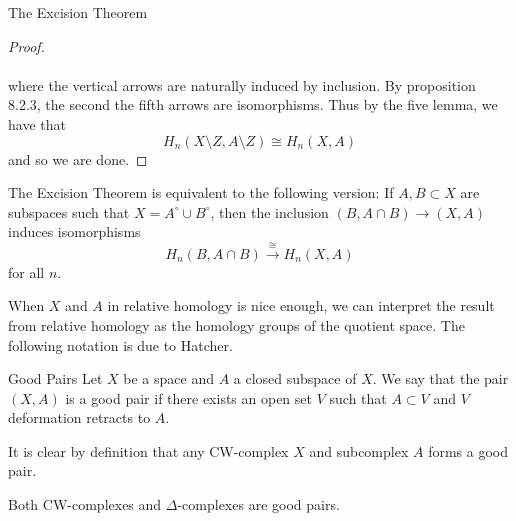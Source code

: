 \documentclass[a4paper]{article}
\begin{document}
\begin{thm}{The Excision Theorem}{}
\begin{proof}
\\~\\
where the vertical arrows are naturally induced by inclusion. By proposition 8.2.3, the second the fifth arrows are isomorphisms. Thus by the five lemma, we have that $$H_n(X\setminus Z,A\setminus Z)\cong H_n(X,A)$$ and so we are done. 
\end{proof}
\end{thm}

\begin{lmm}{}{} The Excision Theorem is equivalent to the following version: If $A,B\subset X$ are subspaces such that $X=A^\circ\cup B^\circ$, then the inclusion $(B,A\cap B)\to (X,A)$ induces isomorphisms $$H_n(B,A\cap B)\overset{\cong}{\longrightarrow} H_n(X,A)$$ for all $n$. 
\end{lmm}

When $X$ and $A$ in relative homology is nice enough, we can interpret the result from relative homology as the homology groups of the quotient space. The following notation is due to Hatcher. 

\begin{defn}{Good Pairs}{} Let $X$ be a space and $A$ a closed subspace of $X$. We say that the pair $(X,A)$ is a good pair if there exists an open set $V$ such that $A\subset V$ and $V$ deformation retracts to $A$. 
\end{defn}

It is clear by definition that any CW-complex $X$ and subcomplex $A$ forms a good pair. 

\begin{lmm}{}{} Both CW-complexes and $\Delta$-complexes are good pairs. 
\end{lmm}
\end{document}
